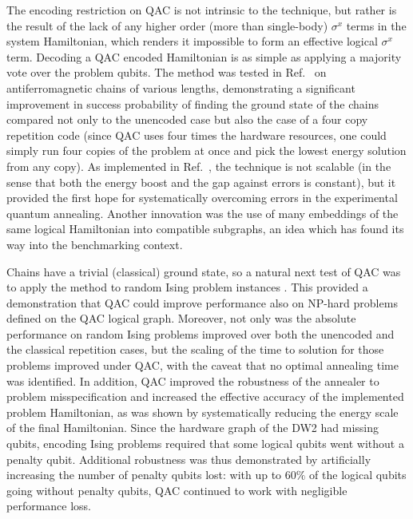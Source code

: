 The encoding restriction on QAC is not intrinsic to the technique, but rather is the result of the lack of any higher order (more than single-body) $\sigma^x$ terms in the system Hamiltonian, which renders it impossible to form an effective logical $\sigma^x$ term. Decoding a QAC encoded Hamiltonian is as simple as applying a majority vote over the problem qubits. The method was tested in Ref.~\cite{PAL:13} on antiferromagnetic chains of various lengths, demonstrating a significant improvement in success probability of finding the ground state of the chains compared not only to the unencoded case but also the case of a four copy repetition code (since QAC uses four times the hardware resources, one could simply run four copies of the problem at once and pick the lowest energy solution from any copy). As implemented in Ref.~\cite{PAL:13}, the technique is not scalable (in the sense that both the energy boost and the gap against errors is constant), but it provided the first hope for systematically overcoming errors in the experimental quantum annealing. Another innovation was the use of many embeddings of the same logical Hamiltonian into compatible subgraphs, an idea which has found its way into the benchmarking context.

Chains have a trivial (classical) ground state, so a natural next test of QAC was to apply the method to random Ising problem instances \cite{PAL:14}. This provided a  demonstration that QAC could improve performance also on NP-hard problems defined on the QAC logical graph. Moreover, not only was the absolute performance on random Ising problems improved over both the unencoded and the classical repetition cases, but the scaling of the time to solution for those problems improved under QAC, with the caveat that no optimal annealing time was identified. In addition, QAC improved the robustness of the annealer to problem misspecification and increased the effective accuracy of the implemented problem Hamiltonian, as was shown by systematically reducing the energy scale of the final Hamiltonian. Since the hardware graph of the DW2 had missing qubits, encoding Ising problems required that some logical qubits went without a penalty qubit. Additional robustness was thus demonstrated by artificially increasing the number of penalty qubits lost: with up to $60\%$ of the logical qubits going without penalty qubits, QAC continued to work with negligible performance loss.


